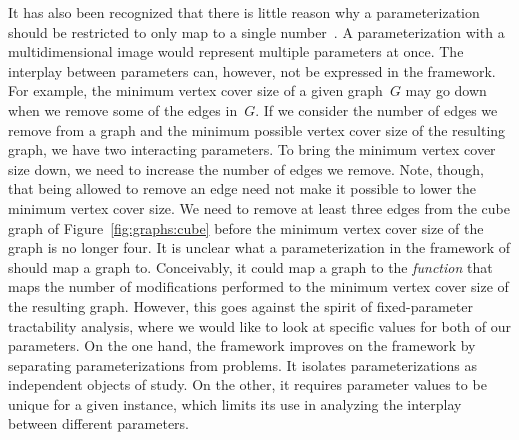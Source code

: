 It has also been recognized that there is little reason why a parameterization should be restricted to only map to a single number~\parencite{fellows2013towards,niedermeier2010reflections}.
A parameterization with a multidimensional image would represent multiple parameters at once.
The interplay between parameters can, however, not be expressed in the \citeauthor{flum2006parameterized} framework.
For example, the minimum vertex cover size of a given graph~$G$ may go down when we remove some of the edges in~$G$.
If we consider the number of edges we remove from a graph and the minimum possible vertex cover size of the resulting graph, we have two interacting parameters.
To bring the minimum vertex cover size down, we need to increase the number of edges we remove.
Note, though, that being allowed to remove an edge need not make it possible to lower the minimum vertex cover size.
We need to remove at least three edges from the cube graph of Figure~\ref{fig:graphs:cube} before the minimum vertex cover size of the graph is no longer four.
It is unclear what a parameterization in the framework of \citeauthor{flum2006parameterized} should map a graph to.
Conceivably, it could map a graph to the \emph{function} that maps the number of modifications performed to the minimum vertex cover size of the resulting graph.
However, this goes against the spirit of fixed-parameter tractability analysis, where we would like to look at specific values for both of our parameters.
On the one hand, the \citeauthor{flum2006parameterized} framework improves on the \citeauthor{downey1999parameterized} framework by separating parameterizations from problems.
It isolates parameterizations as independent objects of study.
On the other, it requires parameter values to be unique for a given instance, which limits its use in analyzing the interplay between different parameters.

